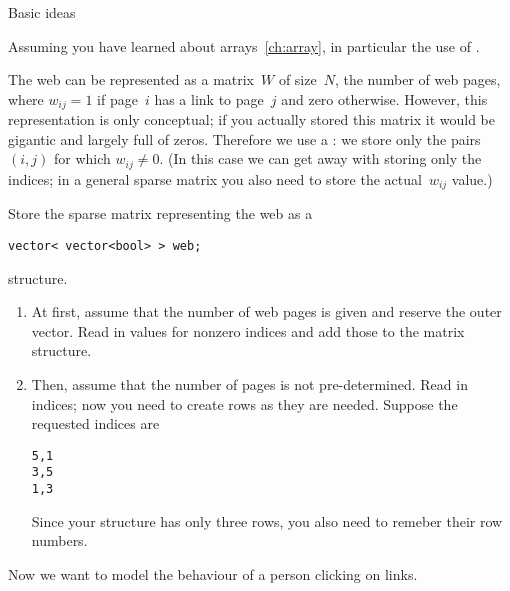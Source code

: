 
 {Basic ideas}

Assuming you have learned about arrays~\ref{ch:array}, in particular
the use of .

The web can be represented as a matrix~$W$ of size~$N$, the number of web
pages, where $w_{ij}=1$ if page~$i$ has a link to page~$j$ and zero
otherwise. However, this representation is only conceptual; if you
actually stored this matrix it would be gigantic and largely full of
zeros. Therefore we use a : we store only
the pairs $(i,j)$ for which $w_{ij}\not=0$. (In this case we can get
away with storing only the indices; in a general sparse matrix you
also need to store the actual~$w_{ij}$ value.)

\begin{exercise}
  Store the sparse matrix representing the web as a
\begin{verbatim}
vector< vector<bool> > web;
\end{verbatim}
  structure.
  \begin{enumerate}
  \item At first, assume that the number of web pages is given and reserve the outer
    vector. Read in values for nonzero indices and add those to the
    matrix structure.
  \item Then, assume that the number of pages is not pre-determined. Read in
    indices; now you need to create rows as they are needed. Suppose
    the requested indices are
\begin{verbatim}
5,1
3,5
1,3
\end{verbatim}
    Since your structure has only three rows, you also need to remeber
    their row numbers.
  \end{enumerate}
\end{exercise}

Now we want to model the behaviour of a person clicking on links.

